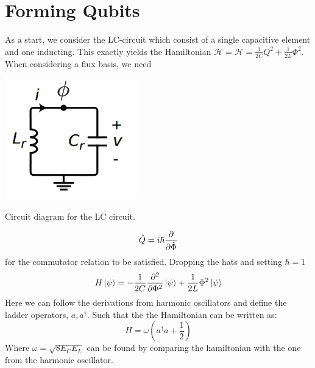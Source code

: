 \section{Forming Qubits}\label{sec:forming_qubits}
As a start, we consider the LC-circuit which consist of a single capacitive element and one inducting. This exactly yields the Hamiltonian $\mathcal{H} = \mathcal{H} = \frac{1}{2C} Q^2 + \frac{1}{2L} \Phi^2$. When considering a flux basis, we need 
\begin{marginfigure}[1 cm]
    \includegraphics[width = \linewidth]{tex/fig_for_text/LC_circuit.png}
    \caption{Circuit diagram for the LC circuit.}
\end{marginfigure}
\begin{equation}
    \hat{Q} = i\hbar \frac{\partial }{\partial \hat{\Phi}}
\end{equation}
for the commutator relation to be satisfied. Dropping the hats and setting $\hbar = 1$
\begin{equation}
    H \ket{\psi} = - \frac{1}{2C} \frac{\partial^2 }{\partial \Phi^2}\ket{\psi} + \frac{1}{2L} \Phi^2 \ket{\psi}
\end{equation}
Here we can follow the derivations from harmonic oscillators and define the ladder operators, $a, a^\dagger$. Such that the the Hamiltonian can be written as:
\begin{equation}
    H = \omega (a^\dagger a + \frac12)
\end{equation}
Where $\omega = \sqrt{8 E_C E_L}$ can be found by comparing the hamiltonian with the one from the harmonic oscillator.

